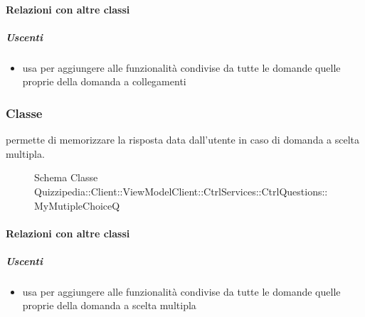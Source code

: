 \paragraph{Relazioni con altre classi}
\subparagraph{Uscenti}
\begin{itemize}
\item usa  per aggiungere alle funzionalità condivise da tutte le domande quelle proprie della domanda a collegamenti
\end{itemize}
\subsubsection{Classe }
permette di memorizzare la risposta data dall'utente in caso di domanda a scelta multipla.
\begin{figure}[H]
\centering
\noindent{}
\caption[Schema Classe MyMutipleChoiceQ]{Schema Classe Quizzipedia::Client::ViewModelClient::CtrlServices::CtrlQuestions::MyMutipleChoiceQ}
\end{figure}
\paragraph{Relazioni con altre classi}
\subparagraph{Uscenti}
\begin{itemize}
\item usa  per aggiungere alle funzionalità condivise da tutte le domande quelle proprie della domanda a scelta multipla
\end{itemize}
